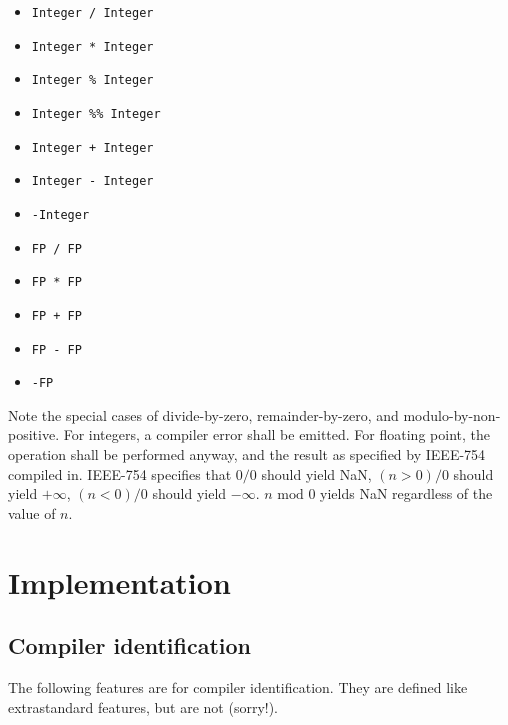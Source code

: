 \documentclass{article}
\begin{document}
\begin{itemize}
\item{\texttt{Integer / Integer}}
\item{\texttt{Integer * Integer}}
\item{\texttt{Integer \% Integer}}
\item{\texttt{Integer \%\% Integer}}
\item{\texttt{Integer + Integer}}
\item{\texttt{Integer - Integer}}
\item{\texttt{-Integer}}
\item{\texttt{FP / FP}}
\item{\texttt{FP * FP}}
\item{\texttt{FP + FP}}
\item{\texttt{FP - FP}}
\item{\texttt{-FP}}
\end{itemize}

Note the special cases of divide-by-zero, remainder-by-zero, and
modulo-by-non-positive. For integers, a compiler error shall be emitted. For
floating point, the operation shall be performed anyway, and the result as
specified by IEEE-754 compiled in. IEEE-754 specifies that $0/0$ should yield
NaN, $(n > 0)/0$ should yield $+\infty$, $(n < 0) / 0$ should yield
$-\infty$. $n \textrm{ mod } 0$ yields NaN regardless of the value of $n$.

\section{Implementation}
\label{sec:implementation}

\subsection{Compiler identification}
\label{sub:implementation:ident}
The following features are for compiler identification. They are defined
like extrastandard features, but are not (sorry!).
\end{document}
